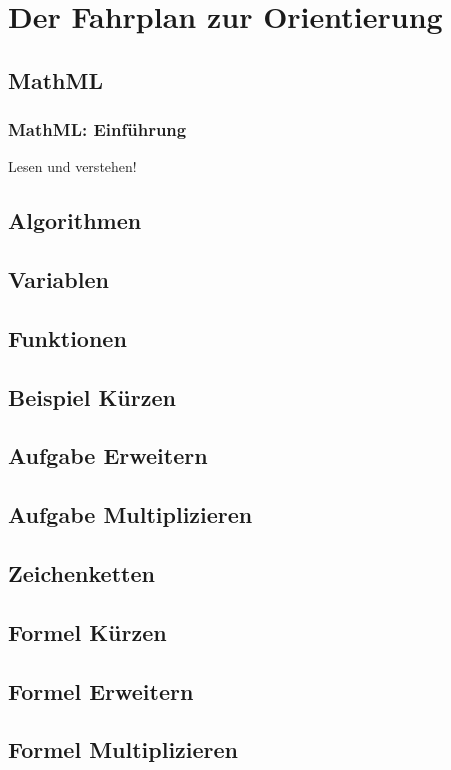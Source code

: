 \section*{Der Fahrplan zur Orientierung}

\subsection*{MathML}

\subsubsection*{MathML: Einführung}

Lesen und verstehen!


\subsection*{Algorithmen}


\subsection*{Variablen}


\subsection*{Funktionen}


\subsection*{Beispiel Kürzen}

\subsection*{Aufgabe Erweitern}

\subsection*{Aufgabe Multiplizieren}

\subsection*{Zeichenketten}

\subsection*{Formel Kürzen}

\subsection*{Formel Erweitern}

\subsection*{Formel Multiplizieren}